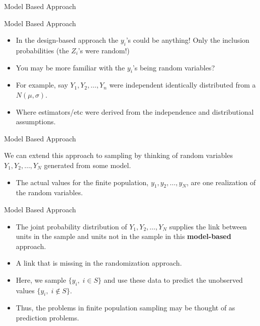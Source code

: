 \documentclass[10pt]{beamer}\usepackage[]{graphicx}\usepackage[]{xcolor}
\begin{document}
\begin{frame}{}
\begin{block}{}
\begin{center}
Model Based Approach
\end{center}
\end{block}
\end{frame}


\begin{frame}{Model Based Approach}

\begin{itemize}
\item In the design-based approach the $y_i$'s could be anything! Only the inclusion probabilities (the $Z_i$'s were random!)
\item You may be more familiar with the $y_i$'s being random variables?
\item For example, say $Y_1,Y_2,\dots, Y_n$ were independent identically distributed from a $N(\mu,\sigma)$.
\item Where estimators/etc were derived from the independence and distributional assumptions.
\end{itemize}

\end{frame}

\begin{frame}{Model Based Approach}

\begin{block}{}
We can extend this approach to sampling by thinking of random variables $Y_1,Y_2,\dots, Y_N$ generated from some model. 

\begin{itemize}
\item The actual values for the finite population, $y_1,y_2,\dots,y_N$, are one realization of the random variables.
\end{itemize}

\end{block}

\end{frame}

\begin{frame}{Model Based Approach}

\begin{block}{}

\begin{itemize}
\item The joint probability distribution of $Y_1, Y_2,\dots,Y_N$ supplies the link between units in the sample and units not in the sample in this \textbf{model-based} approach.
\item A link that is missing in the randomization approach.
\item Here, we sample $\{y_i,\; i\in S\}$ and use these data to predict the unobserved values $\{y_i,\; i \notin S\}$.
\item Thus, the problems in finite population sampling may be thought of as prediction problems.
\end{itemize}
\end{block}

\end{frame}
\end{document}
